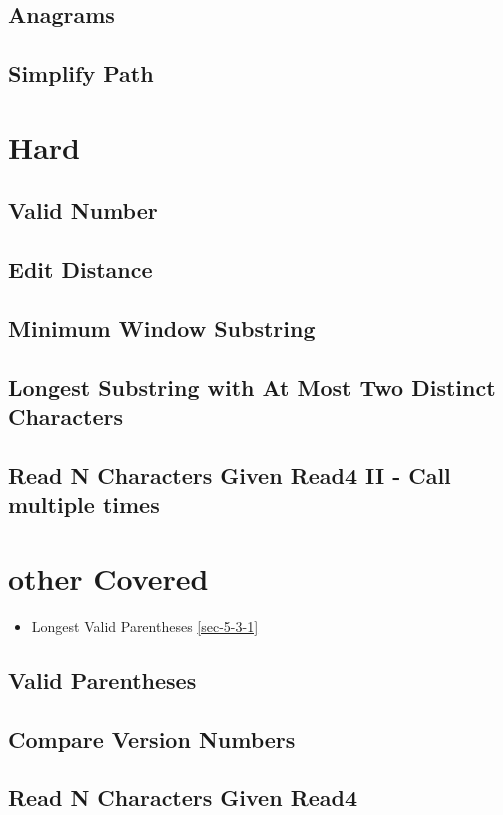 \documentclass[12pt]{book}
\begin{document}
\subsection{Anagrams}
\label{sec-2-2-3}
\subsection{Simplify Path}
\label{sec-2-2-4}
\section{Hard}
\label{sec-2-3}
\subsection{Valid Number}
\label{sec-2-3-1}
\subsection{Edit Distance}
\label{sec-2-3-2}
\subsection{Minimum Window Substring}
\label{sec-2-3-3}
\subsection{Longest Substring with At Most Two Distinct Characters}
\label{sec-2-3-4}
\subsection{Read N Characters Given Read4 II - Call multiple times}
\label{sec-2-3-5}
\section{other Covered}
\label{sec-2-4}
\begin{itemize}
\item Longest Valid Parentheses
\ref{sec-5-3-1}
\end{itemize}
\subsection{Valid Parentheses}
\label{sec-2-4-1}
\subsection{Compare Version Numbers}
\label{sec-2-4-2}
\subsection{Read N Characters Given Read4}
\label{sec-2-4-3}
\end{document}
